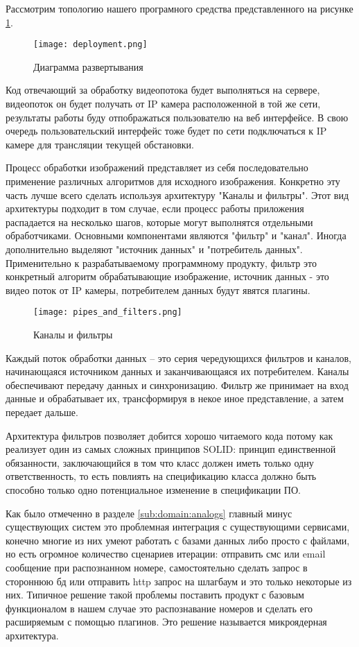Рассмотрим топологию нашего програмного средства представленного на рисунке \ref{fig:arch_arch:deployment}.
\begin{figure}[ht] 
    \centering
    \texttt{[image: deployment.png]}  
    \caption{Диаграмма развертывания}
    \label{fig:arch_arch:deployment}
\end{figure}
Код отвечающий за обработку видеопотока будет выполняться на сервере, видеопоток он будет получать от IP камера расположенной в той же сети, результаты работы буду отпображаться пользователю на веб интерфейсе. В свою очередь пользовательский интерфейс тоже будет по сети подключаться к IP камере для трансляции текущей обстановки.

Процесс обработки изображений представляет из себя последовательно применение различных алгоритмов для исходного изображения. Конкретно эту часть лучше всего сделать используя архитектуру "Каналы и фильтры". Этот вид архитектуры подходит в том случае, если процесс работы приложения распадается на несколько шагов, которые могут выполнятся отдельными обработчиками. Основными компонентами являются "фильтр" и "канал". Иногда дополнительно выделяют "источник данных" и "потребитель данных". Применительно к разрабатываемому программному продукту, фильтр это конкретный алгоритм обрабатывающие изображение, источник данных - это видео поток от IP камеры, потребителем данных будут явятся плагины.

\begin{figure}[ht] 
    \centering
    \texttt{[image: pipes\_and\_filters.png]}  
    \caption{Каналы и фильтры}
    \label{fig:arch_arch:pipes_and_filters}
\end{figure}

Каждый поток обработки данных – это серия чередующихся фильтров и каналов, начинающаяся источником данных и заканчивающаяся их потребителем. Каналы обеспечивают передачу данных и синхронизацию. Фильтр же принимает на вход данные и обрабатывает их, трансформируя в некое иное представление, а затем передает дальше.

Архитектура фильтров позволяет добится хорошо читаемого кода потому как реализует один из самых сложных принципов SOLID: принцип единственной обязанности, заключающийся в том что класс должен иметь только одну ответственность, то есть повлиять на спецификацию класса должно быть способно только одно потенциальное изменение в спецификации ПО. 

Как было отмеченно в разделе \ref{sub:domain:analogs} главный минус существующих систем это проблемная интеграция с существующими сервисами, конечно многие из них умеют работать с базами данных либо просто с файлами, но есть огромное количество сценариев итерации: отправить смс или email сообщение при распознанном номере, самостоятельно сделать запрос в стороннюю бд или отправить http запрос на шлагбаум и это только некоторые из них. Типичное решение такой проблемы поставить продукт с базовым функционалом в нашем случае это распознавание номеров и сделать его расширяемым с помощью плагинов. Это решение называется микроядерная архитектура. 

